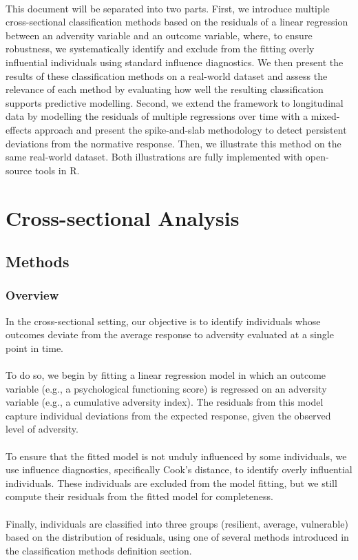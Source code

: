 \documentclass[12pt]{article}
\begin{document}
\\
This document will be separated into two parts. First, we introduce multiple cross-sectional classification methods based on the residuals of a linear regression between an adversity variable and an outcome variable, where, to ensure robustness, we systematically identify and exclude from the fitting overly influential individuals using standard influence diagnostics. We then present the results of these classification methods on a real-world dataset and assess the relevance of each method by evaluating how well the resulting classification supports predictive modelling. Second, we extend the framework to longitudinal data by modelling the residuals of multiple regressions over time with a mixed-effects approach and present the spike-and-slab methodology to detect persistent deviations from the normative response. Then, we illustrate this method on the same real-world dataset. Both illustrations are fully implemented with open-source tools in R.

\section{Cross-sectional Analysis}
\subsection{Methods}
\subsubsection{Overview}
In the cross-sectional setting, our objective is to identify individuals whose outcomes deviate from the average response to adversity evaluated at a single point in time.\\
\\
To do so, we begin by fitting a linear regression model in which an outcome variable (e.g., a psychological functioning score) is regressed on an adversity variable (e.g., a cumulative adversity index). The residuals from this model capture individual deviations from the expected response, given the observed level of adversity.\\
\\
To ensure that the fitted model is not unduly influenced by some individuals, we use influence diagnostics, specifically Cook's distance, to identify overly influential individuals. These individuals are excluded from the model fitting, but we still compute their residuals from the fitted model for completeness.\\
\\
Finally, individuals are classified into three groups (resilient, average, vulnerable) based on the distribution of residuals, using one of several methods introduced in the classification methods definition section.
\end{document}
